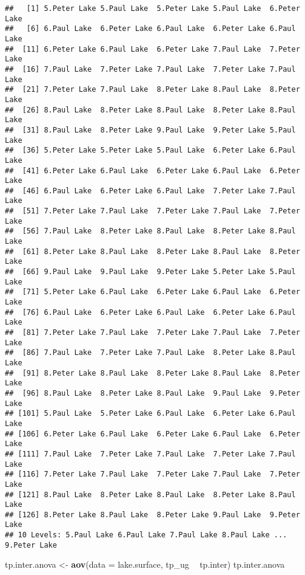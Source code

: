 \documentclass[]{article}
\newenvironment{Shaded}{\begin{snugshade}}{\end{snugshade}}
\newcommand{\DataTypeTok}[1]{\textcolor[rgb]{0.13,0.29,0.53}{#1}}
\newcommand{\KeywordTok}[1]{\textcolor[rgb]{0.13,0.29,0.53}{\textbf{#1}}}
\newcommand{\NormalTok}[1]{#1}
\newcommand{\OperatorTok}[1]{\textcolor[rgb]{0.81,0.36,0.00}{\textbf{#1}}}
\newcommand{\StringTok}[1]{\textcolor[rgb]{0.31,0.60,0.02}{#1}}
\begin{document}
\begin{verbatim}
##   [1] 5.Peter Lake 5.Paul Lake  5.Peter Lake 5.Paul Lake  6.Peter Lake
##   [6] 6.Paul Lake  6.Peter Lake 6.Paul Lake  6.Peter Lake 6.Paul Lake 
##  [11] 6.Peter Lake 6.Paul Lake  6.Peter Lake 7.Paul Lake  7.Peter Lake
##  [16] 7.Paul Lake  7.Peter Lake 7.Paul Lake  7.Peter Lake 7.Paul Lake 
##  [21] 7.Peter Lake 7.Paul Lake  8.Peter Lake 8.Paul Lake  8.Peter Lake
##  [26] 8.Paul Lake  8.Peter Lake 8.Paul Lake  8.Peter Lake 8.Paul Lake 
##  [31] 8.Paul Lake  8.Peter Lake 9.Paul Lake  9.Peter Lake 5.Paul Lake 
##  [36] 5.Peter Lake 5.Peter Lake 5.Paul Lake  6.Peter Lake 6.Paul Lake 
##  [41] 6.Peter Lake 6.Paul Lake  6.Peter Lake 6.Paul Lake  6.Peter Lake
##  [46] 6.Paul Lake  6.Peter Lake 6.Paul Lake  7.Peter Lake 7.Paul Lake 
##  [51] 7.Peter Lake 7.Paul Lake  7.Peter Lake 7.Paul Lake  7.Peter Lake
##  [56] 7.Paul Lake  8.Peter Lake 8.Paul Lake  8.Peter Lake 8.Paul Lake 
##  [61] 8.Peter Lake 8.Paul Lake  8.Peter Lake 8.Paul Lake  8.Peter Lake
##  [66] 9.Paul Lake  9.Paul Lake  9.Peter Lake 5.Peter Lake 5.Paul Lake 
##  [71] 5.Peter Lake 6.Paul Lake  6.Peter Lake 6.Paul Lake  6.Peter Lake
##  [76] 6.Paul Lake  6.Peter Lake 6.Paul Lake  6.Peter Lake 6.Paul Lake 
##  [81] 7.Peter Lake 7.Paul Lake  7.Peter Lake 7.Paul Lake  7.Peter Lake
##  [86] 7.Paul Lake  7.Peter Lake 7.Paul Lake  8.Peter Lake 8.Paul Lake 
##  [91] 8.Peter Lake 8.Paul Lake  8.Peter Lake 8.Paul Lake  8.Peter Lake
##  [96] 8.Paul Lake  8.Peter Lake 8.Paul Lake  9.Paul Lake  9.Peter Lake
## [101] 5.Paul Lake  5.Peter Lake 6.Paul Lake  6.Peter Lake 6.Paul Lake 
## [106] 6.Peter Lake 6.Paul Lake  6.Peter Lake 6.Paul Lake  6.Peter Lake
## [111] 7.Paul Lake  7.Peter Lake 7.Paul Lake  7.Peter Lake 7.Paul Lake 
## [116] 7.Peter Lake 7.Paul Lake  7.Peter Lake 7.Paul Lake  7.Peter Lake
## [121] 8.Paul Lake  8.Peter Lake 8.Paul Lake  8.Peter Lake 8.Paul Lake 
## [126] 8.Peter Lake 8.Paul Lake  8.Peter Lake 9.Paul Lake  9.Peter Lake
## 10 Levels: 5.Paul Lake 6.Paul Lake 7.Paul Lake 8.Paul Lake ... 9.Peter Lake
\end{verbatim}

\begin{Shaded}
\begin{Highlighting}[]
\NormalTok{tp.inter.anova <-}\StringTok{ }\KeywordTok{aov}\NormalTok{(}\DataTypeTok{data =}\NormalTok{ lake.surface, tp_ug }\OperatorTok{~}\StringTok{ }\NormalTok{tp.inter)}
\NormalTok{tp.inter.anova}
\end{Highlighting}
\end{Shaded}
\end{document}

